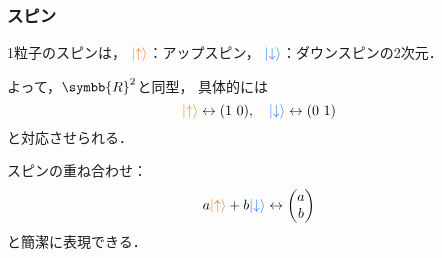 \documentclass[
    10pt,
    ]{sotsu-beamer}
\newcommand{\upspin}{\mathcolor{red}{\ket{\uparrow}}}
\newcommand{\dwspin}{\mathcolor{blue}{\ket{\downarrow}}}
\begin{document}
\begin{frame}
    \frametitle{スピン}

    1粒子のスピンは，
    $\upspin$：アップスピン，
    $\dwspin$：ダウンスピンの2次元．

    \pause

    よって，$\symbb{R}^2$と同型，
    具体的には
    \begin{equation*}
        \upspin \leftrightarrow (1 \,\, 0),
        \quad 
        \dwspin \leftrightarrow (0 \,\, 1)
    \end{equation*}
    と対応させられる．

    \pause

    スピンの重ね合わせ：
    \[  a \upspin + b \dwspin \leftrightarrow 
    \begin{pmatrix}
        a  \\  b
    \end{pmatrix}  \]
    と簡潔に表現できる．

\end{frame}
\end{document}
